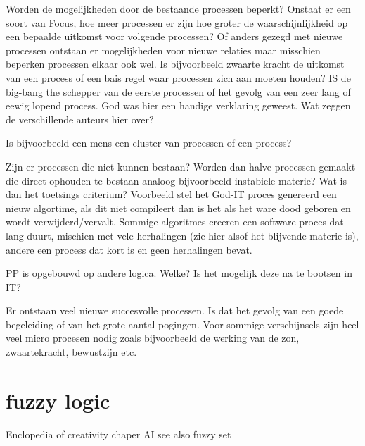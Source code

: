\documentclass[a4paper]{Thesis}
\begin{document}
Worden de mogelijkheden door de bestaande processen beperkt? Onstaat er een soort van Focus, hoe meer processen er zijn hoe groter de waarschijnlijkheid op een bepaalde uitkomst voor volgende processen? Of anders gezegd met nieuwe processen ontstaan er mogelijkheden voor nieuwe relaties maar misschien beperken processen elkaar ook wel.
Is bijvoorbeeld zwaarte kracht de uitkomst van een process of een bais regel waar processen zich aan moeten houden?
IS de big-bang the schepper van de eerste processen of het gevolg van een zeer lang of eewig lopend process. God was hier een handige verklaring geweest.
Wat zeggen de verschillende auteurs hier over?

Is bijvoorbeeld een mens een cluster van processen of een process?

Zijn er processen die niet kunnen bestaan? Worden dan halve processen gemaakt die direct ophouden te bestaan analoog bijvoorbeeld instabiele materie?
Wat is dan het toetsings criterium? Voorbeeld stel het God-IT proces genereerd een nieuw algortime, als dit niet compileert dan is het als het ware dood geboren en wordt verwijderd/vervalt. Sommige algoritmes creeren een software proces dat lang duurt, mischien met vele herhalingen (zie hier alsof het blijvende materie is), andere een process dat kort is en geen herhalingen bevat.

PP is opgebouwd op andere logica. Welke? Is het mogelijk deze na te bootsen in IT?

Er ontstaan veel nieuwe succesvolle processen. Is dat het gevolg van een goede begeleiding of van het grote aantal pogingen. Voor sommige verschijnsels zijn heel veel micro procesen nodig zoals bijvoorbeeld de werking van de zon, zwaartekracht, bewustzijn etc.

\section{fuzzy logic}
Enclopedia of creativity chaper AI
see also fuzzy set
\end{document}
